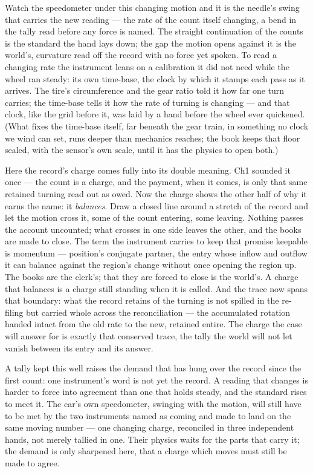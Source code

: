 Watch the speedometer under this changing motion and it is the needle's swing that carries the new reading ---
the rate of the count itself changing, a bend in the tally read before any force is named. The straight
continuation of the counts is the standard the hand lays down; the gap the motion opens against it is the
world's, curvature read off the record with no force yet spoken. To read a changing
rate the instrument leans on a calibration it did not need while the wheel ran steady: its own time-base, the
clock by which it stamps each pass as it arrives. The tire's circumference and the gear ratio told it how far
one turn carries; the time-base tells it how the rate of turning is changing --- and that clock, like the grid
before it, was laid by a hand before the wheel ever quickened. (What fixes the time-base itself, far beneath
the gear train, in something no clock we wind can set, runs deeper than mechanics reaches; the book keeps that
floor sealed, with the sensor's own scale, until it has the physics to open both.)

Here the record's charge comes fully into its double meaning. Ch1 sounded it once --- the count is a charge,
and the payment, when it comes, is only that same retained turning read out as owed. Now the charge shows the
other half of why it earns the name: it \emph{balances}. Draw a closed line around a stretch of the record and
let the motion cross it, some of the count entering, some leaving. Nothing passes the account uncounted; what
crosses in one side leaves the other, and the books are made to close. The term the instrument carries to keep
that promise keepable is momentum --- position's conjugate partner, the entry whose inflow and outflow it can
balance against the region's change without once opening the region up. The books are the clerk's; that they
are forced to close is the world's. A charge that balances is a charge still standing when it is called. And the trace now spans that boundary: what the record retains of the turning is
not spilled in the re-filing but carried whole across the reconciliation --- the accumulated rotation handed
intact from the old rate to the new, retained entire. The charge the case will answer for is exactly that
conserved trace, the tally the world will not let vanish between its entry and its answer.

A tally kept this well raises the demand that has hung over the record since the first count: one instrument's
word is not yet the record. A reading that changes is harder to force into agreement than one that holds
steady, and the standard rises to meet it. The car's own speedometer, swinging with the motion, will still have
to be met by the two instruments named as coming and made to land on the same moving number --- one changing
charge, reconciled in three independent hands, not merely tallied in one. Their physics waits for the parts
that carry it; the demand is only sharpened here, that a charge which moves must still be made to agree.

